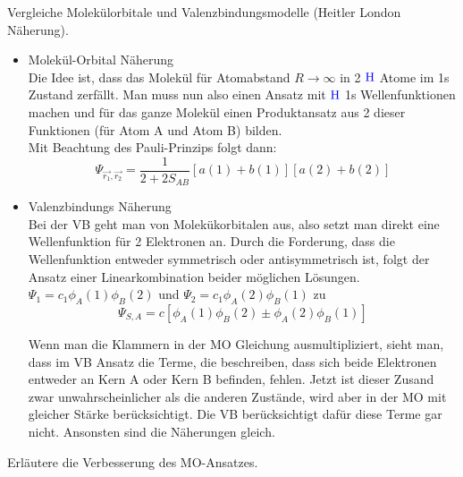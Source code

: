 \documentclass[a5paper,12pt,ngerman,print,grid=front]{kartei}
\let\oldce\ce
\renewcommand*{\ce}[1]{\begingroup\color{blue}\oldce{#1}\endgroup}
\begin{document}
        
    \begin{karte}{
        Vergleiche Molekülorbitale und Valenzbindungsmodelle (Heitler London Näherung).
        }
        
        \begin{itemize}
			\item Molekül-Orbital Näherung \\
			
            Die Idee ist, dass das Molekül für Atomabstand $R \rightarrow \infty$ in 2 
            $\ce{H}$ Atome im 1s Zustand zerfällt. 
            Man muss nun also einen Ansatz mit $\ce{H}$ 1s Wellenfunktionen machen und für 
            das ganze Molekül einen Produktansatz aus 2 dieser Funktionen 
            (für Atom A und Atom B) bilden. \\
            Mit Beachtung des Pauli-Prinzips folgt dann:
            $$\Psi_{\overrightarrow{r_1},\overrightarrow{r_2}} = 
            \frac{1}{2+2S_{AB}}[a(1)+b(1)][a(2)+b(2)]$$
            
            \item Valenzbindungs Näherung \\
             
             Bei der VB geht man von Molekükorbitalen aus, also setzt man direkt eine Wellenfunktion für 2 Elektronen an. Durch die Forderung, dass die Wellenfunktion entweder symmetrisch oder antisymmetrisch ist, folgt der Ansatz einer Linearkombination beider möglichen Lösungen.
             $ \Psi_1 = c_1\phi_A(1)\phi_B(2) $ und $ \Psi_2 = c_1\phi_A(2)\phi_B(1) $ zu
             $$  \Psi_{S,A} = c \left[   \phi_A(1) \phi_B(2) \pm   \phi_A(2) \phi_B(1)   \right]  $$
             
             Wenn man die Klammern in der MO Gleichung ausmultipliziert, sieht man, dass im VB Ansatz die Terme, die beschreiben, dass sich beide Elektronen entweder an Kern A oder Kern B befinden, fehlen.
             Jetzt ist dieser Zusand zwar unwahrscheinlicher als die anderen Zustände, wird aber in der MO mit gleicher Stärke berücksichtigt. Die VB berücksichtigt dafür diese Terme gar nicht.
             Ansonsten sind die Näherungen gleich.
            
		\end{itemize}
        
    \end{karte}
    
    
    \begin{karte}{
        Erläutere die Verbesserung des MO-Ansatzes.
        }
    \end{karte}
    
\end{document}
